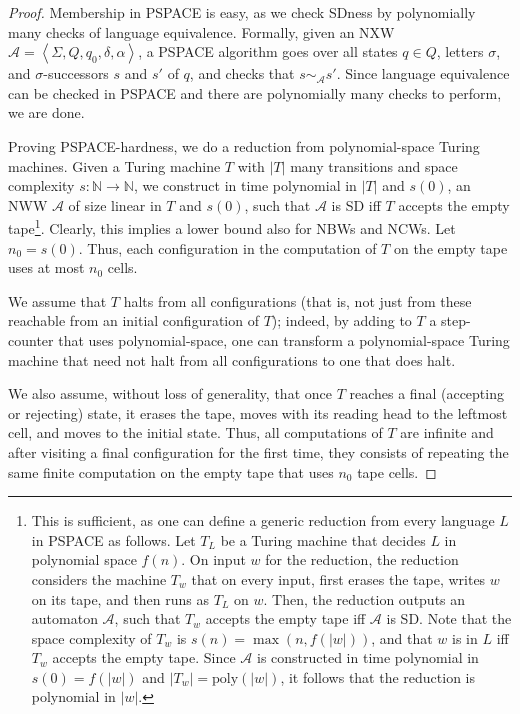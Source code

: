 \documentclass[10pt,a4paper]{amsart}
\theoremstyle{definition}
\numberwithin{equation}{section}
\newcommand{\A}{{\mathcal A}}
\newcommand{\zug}[1]{\left\langle #1 \right\rangle}
\newcommand{\nxw}{NXW\xspace}
\begin{document}
\begin{proof}
Membership in PSPACE is easy, as we check SDness by polynomially many checks of language equivalence. Formally, given an \nxw $\A=\zug{\Sigma,Q,q_0,\delta,\alpha}$, a PSPACE algorithm goes over all states $q \in Q$, letters $\sigma$, and $\sigma$-successors $s$ and $s'$ of $q$, and checks that $s \sim_\A s'$.  Since language equivalence can be checked in PSPACE \cite{SVW87} and there are polynomially many checks to perform, we are done. 

Proving PSPACE-hardness, we do a reduction from polynomial-space Turing machines. Given a Turing machine $T$ with
$|T|$ many transitions and space complexity $s:\mathbb{N}\rightarrow\mathbb{N}$, we construct in time polynomial in $|T|$ and $s(0)$, an NWW $\A$ of size linear in $T$ and $s(0)$, such that $\A$ is SD iff $T$ accepts the empty tape\footnote{This is sufficient, as one can define a generic reduction from every language $L$ in PSPACE as follows. Let $T_L$ be a Turing machine that decides $L$ in polynomial space $f(n)$. On input $w$ for the reduction, the reduction considers the machine $T_w$ that on every input, first erases the tape, writes $w$ on its tape, and then runs as $T_L$ on $w$. Then, the reduction outputs an automaton $\A$, such that $T_w$ accepts the empty tape iff $\A$ is SD. Note that the space complexity of $T_w$ is $s(n) = \max(n ,f(|w|))$, and that $w$ is in $L$ iff $T_w$ accepts the empty tape. Since $\A$ is constructed in time polynomial in $s(0)=f(|w|)$ and $|T_w|=\mathrm{poly}(|w|)$, it follows that the reduction is polynomial in $|w|$.}. Clearly, this implies a lower bound also for NBWs and NCWs. 
Let $n_0=s(0)$. Thus, each configuration in the computation of $T$ on the empty tape uses at most $n_0$ cells. 

We assume that $T$ halts from all configurations (that is, not just from these reachable from an initial configuration of $T$); indeed, by adding to $T$ a step-counter that uses polynomial-space, one can transform a polynomial-space Turing machine that need not halt from all configurations to one that does halt. 

We also assume, without loss of generality, that once $T$ reaches a final (accepting or rejecting) state, it erases the tape, moves with its reading head to the leftmost cell, and moves to the initial state. Thus, all computations of $T$ are infinite and after visiting a final configuration for the first time, they consists of repeating the same finite computation on the empty tape
that uses $n_0$ tape cells. 


\end{proof}
\end{document}
